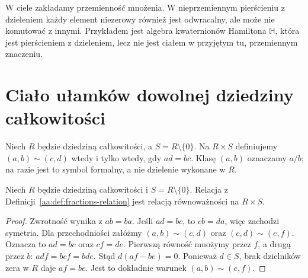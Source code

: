 \begin{uwaga}
W ciele zakładamy przemienność mnożenia. W nieprzemiennym
pierścieniu z dzieleniem każdy element niezerowy również
jest odwracalny, ale może nie komutować z innymi.
Przykładem jest algebra kwaternionów Hamiltona $\mathbb H$,
która jest pierścieniem z dzieleniem, lecz nie jest ciałem
w przyjętym tu, przemiennym znaczeniu.
\end{uwaga}

\section{Ciało ułamków dowolnej dziedziny całkowitości}
\begin{definicja}
\label{aa:def:fractions-relation}
Niech $R$ będzie dziedziną całkowitości, a
$S=R\setminus\{0\}$. Na $R\times S$ definiujemy
$(a,b)\sim(c,d)$ wtedy i tylko wtedy, gdy $ad=bc$.
Klasę $(a,b)$ oznaczamy $a/b$; na razie jest to
symbol formalny, a nie dzielenie wykonane w $R$.
\end{definicja}

\begin{lemat}
\label{aa:lem:fractions-equivalence}
Niech $R$ będzie dziedziną całkowitości i
$S=R\setminus\{0\}$. Relacja z
Definicji~\ref{aa:def:fractions-relation} jest relacją
równoważności na $R\times S$.
\end{lemat}
\begin{proof}
Zwrotność wynika z $ab=ba$. Jeśli $ad=bc$, to
$cb=da$, więc zachodzi symetria. Dla przechodniości
załóżmy $(a,b)\sim(c,d)$ oraz $(c,d)\sim(e,f)$.
Oznacza to $ad=bc$ oraz $cf=de$. Pierwszą równość
mnożymy przez $f$, a drugą przez $b$:
$adf=bcf=bde$. Stąd $d(af-be)=0$. Ponieważ
$d\in S$, brak dzielników zera w $R$ daje $af=be$.
Jest to dokładnie warunek $(a,b)\sim(e,f)$.
\end{proof}

